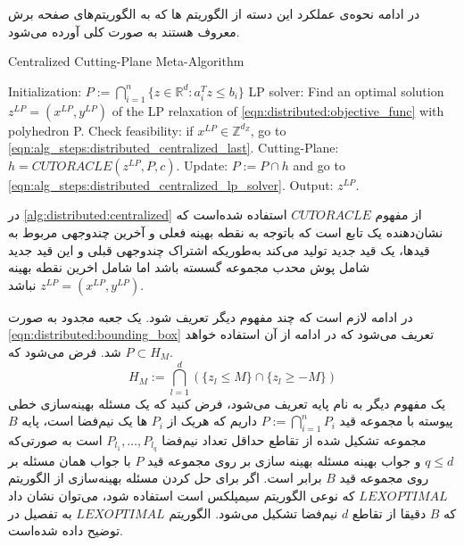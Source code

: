 	در ادامه نحوه‌ی عملکرد این دسته از الگوریتم ها که به الگوریتم‌های صفحه برش معروف هستند به صورت کلی آورده می‌شود. 
\begin{latin}
	\begin{algorithm}
		\caption{Centralized Cutting-Plane Meta-Algorithm}
		\label{alg:distributed:centralized}
		\begin{algorithmic}[1]
			\State Initialization: $ P := \bigcap_{i=1}^n \{ z \in \mathbb{R}^d : a_i^Tz \le b_i\}$
			\State LP solver: Find an optimal solution $z^{LP} = (x^{LP},y^{LP})$ of the LP relaxation of \cref{eqn:distributed:objective_func} with polyhedron P. \label{eqn:alg_steps:distributed_centralized_lp_solver}
			\State Check feasibility: if $x^{LP} \in \mathbb{Z}^{d_Z}$, go to \cref{eqn:alg_steps:distributed_centralized_last}.
			\State Cutting-Plane: $h = CUTORACLE(z^{LP},P,c)$.
			\State Update: $P := P \cap h$ and go to \cref{eqn:alg_steps:distributed_centralized_lp_solver}.
			\State Output: $z^{LP}$\label{eqn:alg_steps:distributed_centralized_last}.
		\end{algorithmic}
	\end{algorithm}
\end{latin}

	در \cref{alg:distributed:centralized} از مفهوم $CUTORACLE$ استفاده شده‌است که نشان‌دهنده یک تابع است که باتوجه به نقطه بهینه فعلی و آخرین چندوجهی مربوط به قیدها، یک قید جدید تولید می‌کند به‌طوریکه اشتراک چندوجهی قبلی و این قید جدید شامل پوش محدب مجموعه گسسته  باشد اما شامل اخرین نقطه بهینه $z^{LP} = (x^{LP},y^{LP})$ نباشد.
	
	در ادامه لازم است که چند مفهوم دیگر تعریف شود. یک جعبه مجدود به صورت \cref{eqn:distributed:bounding_box} تعریف می‌شود که در ادامه از آن استفاده خواهد شد. فرض می‌شود که $P \subset H_M$.
\begin{equation}\label{eqn:distributed:bounding_box}
H_M := \bigcap_{l=1}^d (\{ z_l \le M \} \cap \{ z_l \ge -M \})
\end{equation}
	یک مفهوم دیگر به نام پایه تعریف می‌شود، فرض کنید که یک مسئله بهینه‌سازی خطی پیوسته با مجموعه قید $P := \bigcap_{i=1}^n P_i$ داریم که هریک از $P_i$ ها یک نیم‌فضا است، پایه $B$ مجموعه‌ تشکیل شده از تقاطع حداقل تعداد نیم‌فضا $P_{l_1}, \dots, P_{l_q}$ است به صورتی‌که $q \le d$ و جواب بهینه مسئله بهینه سازی بر روی مجموعه قید $P$ با جواب همان مسئله بر روی مجموعه قید $B$ برابر است. اگر برای حل کردن مسئله بهینه‌سازی از الگوریتم $LEXOPTIMAL$ که نوعی الگوریتم سیمپلکس است استفاده شود، می‌توان نشان داد که $B$ دقیقا از تقاطع $d$ نیم‌فضا تشکیل می‌شود.  الگوریتم $LEXOPTIMAL$ به تفصیل در \cite{jones2007lexicographic} توضیح داده شده‌است.
	
